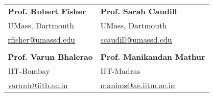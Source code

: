 \begin{figure}[h]
    \begin{tabular}{p{} p{}}
        \textbf{Prof. Robert Fisher}       & \textbf{Prof. Sarah Caudill} \\
        UMass, Dartmouth                   & UMass, Dartmouth             \\
        \href{mailto://rfisher@umassd.edu}{rfisher@umassd.edu} & \href{mailto://scaudill@umassd.edu}{scaudill@umassd.edu} \\
        & \\
        \textbf{Prof. Varun Bhalerao}      & \textbf{Prof. Manikandan Mathur} \\
        IIT-Bombay                         & IIT-Madras                       \\
        \href{mailto://varunb@iitb.ac.in}{varunb@iitb.ac.in} & \href{mailto://manims@ae.iitm.ac.in}{manims@ae.iitm.ac.in} \\
    \end{tabular}        
\end{figure}